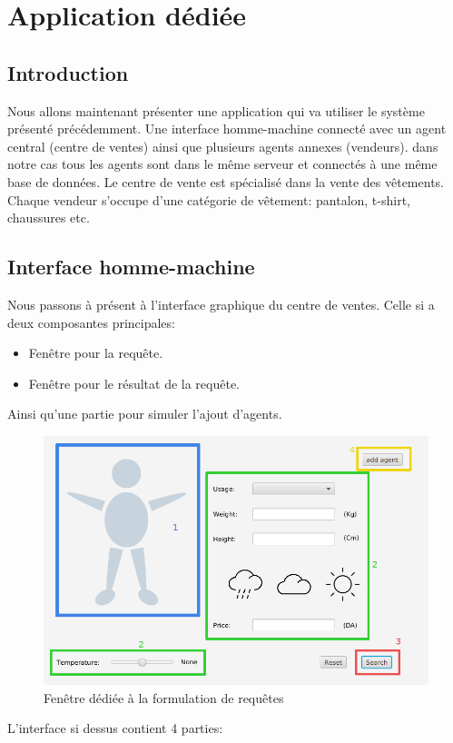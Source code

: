 \chapter{Application dédiée}
\section{Introduction}
Nous allons maintenant présenter une application qui va utiliser le système présenté précédemment. Une interface homme-machine connecté avec un agent central (centre de ventes) ainsi que plusieurs agents annexes (vendeurs). dans notre cas tous les agents sont dans le même serveur et connectés à une même base de données.
Le centre de vente est spécialisé dans la vente des vêtements. Chaque vendeur s'occupe d'une catégorie de vêtement: pantalon, t-shirt, chaussures etc.
\section{Interface homme-machine}
Nous passons à présent à l’interface graphique du centre de ventes. Celle si a deux composantes principales:
\begin{itemize}
	\item Fenêtre pour la requête.
	\item Fenêtre pour le résultat de la requête.
\end{itemize}
Ainsi qu’une partie pour simuler l’ajout d’agents.
\begin{figure}[H]
	\centering
	\includegraphics[scale=0.4]{imgs/agentUI1.png}
	\caption{Fenêtre dédiée à la formulation de requêtes}
	\label{fig:queryWin}
\end{figure}
L’interface si dessus contient 4 parties:
